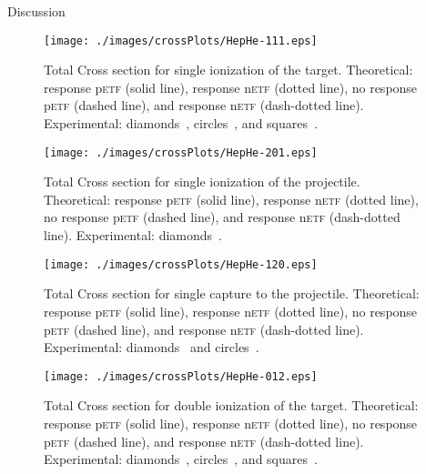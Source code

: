 \documentclass[aps, pra, preprint, groupedaddress, amsfonts,
               amsmath, amssymb, showpacs, nofootinbib]{revtex4-1}
\begin{document}
\begin{section}{Discussion \label{sec:disc}}

   \begin{figure}[htp]
      \centering
      \texttt{[image: ./images/crossPlots/HepHe-111.eps]}
      \caption{Total Cross section for single ionization of the target.
               Theoretical: response p\textsc{etf} (solid line), response n\textsc{etf} (dotted line),
                            no response p\textsc{etf} (dashed line), and response n\textsc{etf}
                            (dash-dotted line).
               Experimental: diamonds~\cite{Dub-89}, circles~\cite{FTFHLP-95}, and squares~\cite{DT-88}.
               \label{fig:cs111}}
   \end{figure}

   \begin{figure}[htp]
      \centering
      \texttt{[image: ./images/crossPlots/HepHe-201.eps]}
      \caption{Total Cross section for single ionization of the projectile.
               Theoretical: response p\textsc{etf} (solid line), response n\textsc{etf} (dotted line),
                            no response p\textsc{etf} (dashed line), and response n\textsc{etf}
                            (dash-dotted line).
               Experimental: diamonds~\cite{Dub-89}.
\label{fig:cs201}}
   \end{figure}

   \begin{figure}[htp]
      \centering
      \texttt{[image: ./images/crossPlots/HepHe-120.eps]}
      \caption{Total Cross section for single capture to the projectile.
               Theoretical: response p\textsc{etf} (solid line), response n\textsc{etf} (dotted line),
                            no response p\textsc{etf} (dashed line), and response n\textsc{etf}
                            (dash-dotted line).
               Experimental: diamonds~\cite{Dub-89} and circles~\cite{FTFHLP-95}.
 \label{fig:cs120}}
   \end{figure}

   \begin{figure}[htp]
      \centering
      \texttt{[image: ./images/crossPlots/HepHe-012.eps]}
      \caption{Total Cross section for double ionization of the target.
               Theoretical: response p\textsc{etf} (solid line), response n\textsc{etf} (dotted line),
                            no response p\textsc{etf} (dashed line), and response n\textsc{etf}
                            (dash-dotted line).
               Experimental: diamonds~\cite{Dub-89}, circles~\cite{FTFHLP-95}, and squares~\cite{DT-88}.
 \label{fig:cs012}}
   \end{figure}


\end{section}
\end{document}

